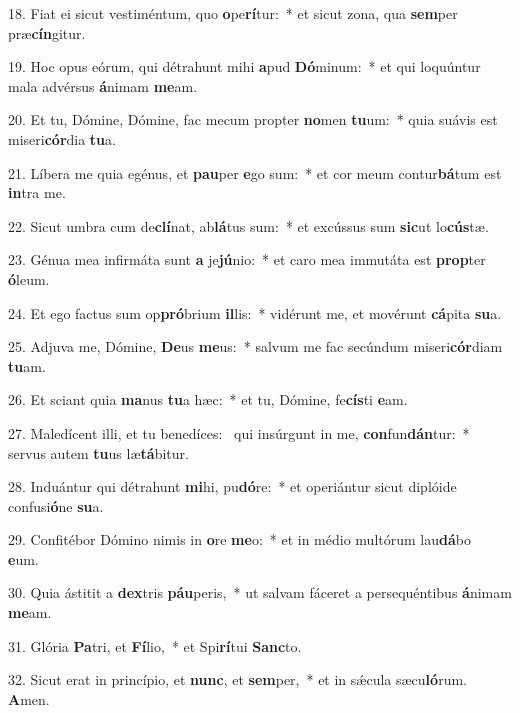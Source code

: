 18. Fiat ei sicut vestiméntum, quo \textbf{o}pe\textbf{rí}tur:~*  et sicut zona, qua \textbf{sem}per præ\textbf{cín}gitur.\

19. Hoc opus eórum, qui détrahunt mihi \textbf{a}pud \textbf{Dó}minum:~*  et qui loquúntur mala advérsus \textbf{á}nimam \textbf{me}am.\

20. Et tu, Dómine, Dómine, fac mecum propter \textbf{no}men \textbf{tu}um:~*  quia suávis est miseri\textbf{cór}dia \textbf{tu}a.\

21. Líbera me quia egénus, et \textbf{pau}per \textbf{e}go sum:~*  et cor meum contur\textbf{bá}tum est \textbf{in}tra me.\

22. Sicut umbra cum de\textbf{clí}nat, ab\textbf{lá}tus sum:~*  et excússus sum \textbf{sic}ut lo\textbf{cús}tæ.\

23. Génua mea infirmáta sunt \textbf{a} je\textbf{jú}nio:~*  et caro mea immutáta est \textbf{prop}ter \textbf{ó}leum.\

24. Et ego factus sum op\textbf{pró}brium \textbf{il}lis:~*  vidérunt me, et movérunt \textbf{cá}pita \textbf{su}a.\

25. Adjuva me, Dómine, \textbf{De}us \textbf{me}us:~*  salvum me fac secúndum miseri\textbf{cór}diam \textbf{tu}am.\

26. Et sciant quia \textbf{ma}nus \textbf{tu}a hæc:~*  et tu, Dómine, fe\textbf{cís}ti \textbf{e}am.\

27. Maledícent illi, et tu benedíces: \dag\  qui insúrgunt in me, \textbf{con}fun\textbf{dán}tur:~*  servus autem \textbf{tu}us læ\textbf{tá}bitur.\

28. Induántur qui détrahunt \textbf{mi}hi, pu\textbf{dó}re:~*  et operiántur sicut diplóide confusi\textbf{ó}ne \textbf{su}a.\

29. Confitébor Dómino nimis in \textbf{o}re \textbf{me}o:~*  et in médio multórum lau\textbf{dá}bo \textbf{e}um.\

30. Quia ástitit a \textbf{dex}tris \textbf{páu}peris,~*  ut salvam fáceret a persequéntibus \textbf{á}nimam \textbf{me}am.\

31. Glória \textbf{Pa}tri, et \textbf{Fí}lio,~*  et Spi\textbf{rí}tui \textbf{Sanc}to.\

32. Sicut erat in princípio, et \textbf{nunc}, et \textbf{sem}per,~*  et in sǽcula sæcu\textbf{ló}rum. \textbf{A}men.\

